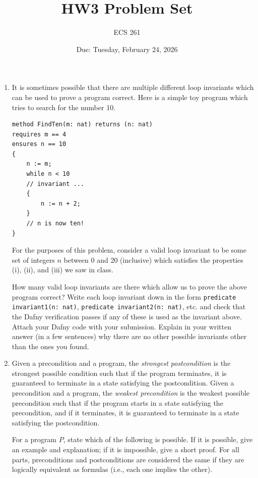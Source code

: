 \documentclass{article}
\begin{document}
\title{HW3 Problem Set}
\author{ECS 261}
\date{Due: Tuesday, February 24, 2026}

\maketitle

\noindent\hrulefill

\begin{enumerate}

\item
It is sometimes possible that there are multiple different loop invariants
which can be used to prove a program correct.
Here is a simple toy program which tries to search for the number 10.
\begin{verbatim}
method FindTen(m: nat) returns (n: nat)
requires m == 4
ensures n == 10
{
    n := m;
    while n < 10
    // invariant ...
    {
        n := n + 2;
    }
    // n is now ten!
}
\end{verbatim}

For the purposes of this problem, consider a valid loop invariant to be some set of integers
$n$ between 0 and 20 (inclusive)
which satisfies the properties (i), (ii), and (iii) we saw in class.

How many valid loop invariants are there which allow us to prove the above program correct?
Write each loop invariant down in the form \texttt{predicate invariant1(n: nat)}, \texttt{predicate invariant2(n: nat)}, etc. and check that the Dafny verification passes if any of these
is used as the invariant above.
Attach your Dafny code with your submission.
Explain in your written answer (in a few sentences) why there are no other possible invariants other than the ones you found.

\item
Given a precondition and a program, the \emph{strongest postcondition} is the strongest possible condition such that if the program terminates, it is guaranteed to terminate in a state satisfying the postcondition.
Given a precondition and a program, the \emph{weakest precondition} is the weakest possible precondition such that if the program starts in a state satisfying the precondition, and if it terminates, it is guaranteed to terminate in a state satisfying the postcondition.

For a program $P$, state which of the following is possible.
If it is possible, give an example and explanation;
if it is impossible, give a short proof.
For all parts, preconditions and postconditions are considered the same if they are
logically equivalent as formulas (i.e., each one implies the other).


\end{enumerate}
\end{document}
